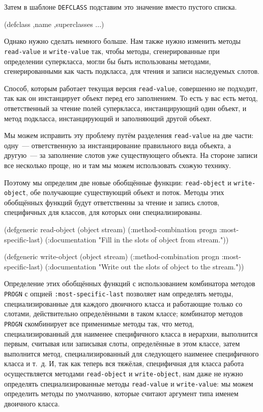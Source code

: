 Затем в шаблоне \lstinline{DEFCLASS} подставим это значение вместо пустого списка.

\begin{myverb}
(defclass ,name ,superclasses
  ...)
\end{myverb}

Однако нужно сделать немного больше. Нам также нужно изменить методы \lstinline{read-value} и
\lstinline{write-value} так, чтобы методы, сгенерированные при определении супер\-клас\-са, могли
бы быть использованы методами, сгенерированными как часть подкласса, для чтения и записи
наследуемых слотов.

Способ, которым работает текущая версия \lstinline{read-value}, совершенно не подходит, так как
он инстанцирует объект перед его заполнением. То есть у вас есть метод, ответственный за
чтение полей суперкласса, инстанцирующий один объект, и метод подкласса, инстанцирующий и
заполняющий другой объект.

Мы можем исправить эту проблему путём разделения \lstinline{read-value} на две части: одну~---
ответственную за инстанцирование правильного вида объекта, а другую~--- за заполнение
слотов уже существующего объекта. На стороне записи все несколько проще, но и там мы можем
использовать схожую технику.

Поэтому мы определим две новые обобщённые функции: \lstinline{read-object} и
\lstinline{write-object}, обе получающие существующий объект и поток. Методы этих обобщённых
функций будут ответственны за чтение и запись слотов, специфичных для классов, для которых
они специализированы.

\begin{myverb}
(defgeneric read-object (object stream)
  (:method-combination progn :most-specific-last)
  (:documentation "Fill in the slots of object from stream."))

(defgeneric write-object (object stream)
  (:method-combination progn :most-specific-last)
  (:documentation "Write out the slots of object to the stream."))
\end{myverb}

Определение этих обобщённых функций с использованием комбинатора методов \lstinline{PROGN} с
опцией \lstinline{:most-specific-last} позволяет нам определять методы, специализированные для
каждого двоичного класса и работающие только со слотами, действительно определёнными в
таком классе; комбинатор методов \lstinline{PROGN} скомбинирует все применимые методы так,
что метод, специализированный для наименее специфичного класса в иерархии, выполнится
первым, считывая или записывая слоты, определённые в этом классе, затем выполнится метод,
специализированный для следующего наименее специфичного класса и т.~д. И, так как теперь
вся тяжёлая, специфичная для класса работа осуществляется методами \lstinline{read-object} и
\lstinline{write-object}, нам даже не нужно определять специализированные методы
\lstinline{read-value} и \lstinline{write-value}: мы можем определить методы по умолчанию, которые
считают аргумент типа именем двоичного класса.


